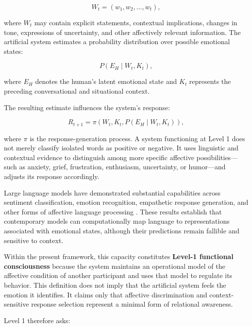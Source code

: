 \begin{equation}\label{eq2}
W_t=(w_1,w_2,\ldots,w_t),
\end{equation}

where \(W_t\) may contain explicit statements, contextual implications, changes in tone, expressions of uncertainty, and other affectively relevant information. The artificial system estimates a probability distribution over possible emotional states:

\begin{equation}\label{eq3}
P(E_H \mid W_t, K_t),
\end{equation}

where \(E_H\) denotes the human’s latent emotional state and \(K_t\) represents the preceding conversational and situational context.

The resulting estimate influences the system’s response:

\begin{equation}\label{eq4}
R_{t+1}
=
\pi\!\left(
W_t,
K_t,
P(E_H \mid W_t,K_t)
\right),
\end{equation}

where \(\pi\) is the response-generation process. A system functioning at Level 1 does not merely classify isolated words as positive or negative. It uses linguistic and contextual evidence to distinguish among more specific affective possibilities—such as anxiety, grief, frustration, enthusiasm, uncertainty, or humor—and adjusts its response accordingly.

Large language models have demonstrated substantial capabilities across sentiment classification, emotion recognition, empathetic response generation, and other forms of affective language processing \cite{zhang2024sentiment,chen2024emotionqueen}. These results establish that contemporary models can computationally map language to representations associated with emotional states, although their predictions remain fallible and sensitive to context.

Within the present framework, this capacity constitutes \textbf{Level-1 functional consciousness} because the system maintains an operational model of the affective condition of another participant and uses that model to regulate its behavior. This definition does not imply that the artificial system feels the emotion it identifies. It claims only that affective discrimination and context-sensitive response selection represent a minimal form of relational awareness.

Level 1 therefore asks:

